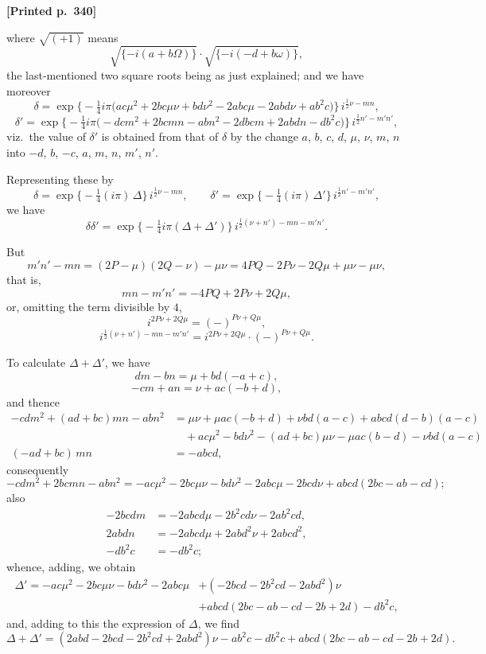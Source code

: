 \documentclass[11pt]{article}
\begin{document}
\medskip

\noindent\textbf{[Printed p.~340]}\hfill

\noindent where $\sqrt{(+1)}$ means
\[
\sqrt{\{-i(a+b\Omega)\}}\cdot\sqrt{\{-i(-d+b\omega)\}},
\]
the last-mentioned two square roots being as just explained; and we have moreover
\[
\delta = \exp\bigl\{-\tfrac{1}{4}i\pi\bigl(ac\mu^{2} + 2bc\mu\nu + bd\nu^{2} - 2abc\mu - 2abd\nu + ab^{2}c\bigr)\bigr\}\, i^{\tfrac{1}{2}\nu - mn},
\]
\[
\delta' = \exp\bigl\{-\tfrac{1}{4}i\pi\bigl(-dcm^{2} + 2bcmn - abn^{2} - 2dbcm + 2abdn - db^{2}c\bigr)\bigr\}\, i^{\tfrac{1}{2}n' - m'n'},
\]
viz.\ the value of $\delta'$ is obtained from that of $\delta$ by the change $a$, $b$, $c$, $d$, $\mu$, $\nu$, $m$, $n$ into $-d$, $b$, $-c$, $a$, $m$, $n$, $m'$, $n'$.

Representing these by
\[
\delta = \exp\bigl\{-\tfrac{1}{4}(i\pi)\,\Delta\bigr\}\, i^{\tfrac{1}{2}\nu - mn},\qquad \delta' = \exp\bigl\{-\tfrac{1}{4}(i\pi)\,\Delta'\bigr\}\, i^{\tfrac{1}{2}n' - m'n'},
\]
we have
\[
\delta\delta' = \exp\bigl\{-\tfrac{1}{4}i\pi(\Delta + \Delta')\bigr\}\, i^{\tfrac{1}{2}(\nu + n') - mn - m'n'}.
\]

But
\[
m'n' - mn = (2P - \mu)(2Q - \nu) - \mu\nu = 4PQ - 2P\nu - 2Q\mu + \mu\nu - \mu\nu,
\]
that is,
\[
mn - m'n' = -4PQ + 2P\nu + 2Q\mu,
\]
or, omitting the term divisible by $4$,
\[
i^{2P\nu + 2Q\mu} = (-)^{P\nu + Q\mu},
\]
\[
i^{\tfrac{1}{2}(\nu + n') - mn - m'n'} = i^{2P\nu + 2Q\mu} \cdot (-)^{P\nu + Q\mu}.
\]

To calculate $\Delta + \Delta'$, we have
\[
dm - bn = \mu + bd(-a + c),
\]
\[
-cm + an = \nu + ac(-b + d),
\]
and thence
\begin{align*}
-cdm^{2} + (ad + bc)mn - abn^{2} &= \mu\nu + \mu ac(-b + d) + \nu bd(a - c) + abcd(d - b)(a - c) \\
&\quad + ac\mu^{2} - bd\nu^{2} - (ad + bc)\mu\nu - \mu ac(b - d) - \nu bd(a - c) \\
(-ad + bc)\,mn &= - abcd,
\end{align*}
consequently
\[
-cdm^{2} + 2bcmn - abn^{2} = -ac\mu^{2} - 2bc\mu\nu - bd\nu^{2} - 2abc\mu - 2bcd\nu + abcd(2bc - ab - cd);
\]
also
\begin{align*}
-2bcdm &= -2abcd\mu - 2b^{2}cd\nu - 2ab^{2}cd, \\
2abdn &= -2abcd\mu + 2abd^{2}\nu + 2abcd^{2}, \\
-db^{2}c &= -db^{2}c;
\end{align*}
whence, adding, we obtain
\begin{align*}
\Delta' = -ac\mu^{2} - 2bc\mu\nu - bd\nu^{2} - 2abc\mu &+ (-2bcd - 2b^{2}cd - 2abd^{2})\nu \\
 &+ abcd(2bc - ab - cd - 2b + 2d) - db^{2}c,
\end{align*}
and, adding to this the expression of $\Delta$, we find
\[
\Delta + \Delta' = (2abd - 2bcd - 2b^{2}cd + 2abd^{2})\nu - ab^{2}c - db^{2}c + abcd(2bc - ab - cd - 2b + 2d).
\]
\end{document}

